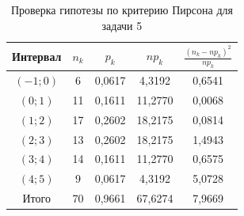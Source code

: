 \begin{table}[H]
\centering
\caption{Проверка гипотезы по критерию Пирсона для задачи 5}
\small
\begin{tabular}{ccccc}
\toprule
Интервал & $n_k$ & $p_k$ & $n p_k$ & $\frac{(n_k-np_k)^2}{np_k}$ \\
\midrule
$(-1; 0)$ & 6 & 0,0617 & 4,3192 & 0,6541 \\
$(0; 1)$ & 11 & 0,1611 & 11,2770 & 0,0068 \\
$(1; 2)$ & 17 & 0,2602 & 18,2175 & 0,0814 \\
$(2; 3)$ & 13 & 0,2602 & 18,2175 & 1,4943 \\
$(3; 4)$ & 14 & 0,1611 & 11,2770 & 0,6575 \\
$(4; 5)$ & 9 & 0,0617 & 4,3192 & 5,0728 \\
Итого & 70 & 0,9661 & 67,6274 & 7,9669 \\
\bottomrule
\end{tabular}
\end{table}

